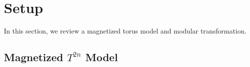 \documentclass[11pt]{article}
\begin{document}



%

\section{Setup}
\label{sec:Setup}
In this section, we review a magnetized torus model and modular transformation. 

\subsection{Magnetized $T^{2n}$ Model}
\label{subsec:Magetized T2n model}
\end{document}
